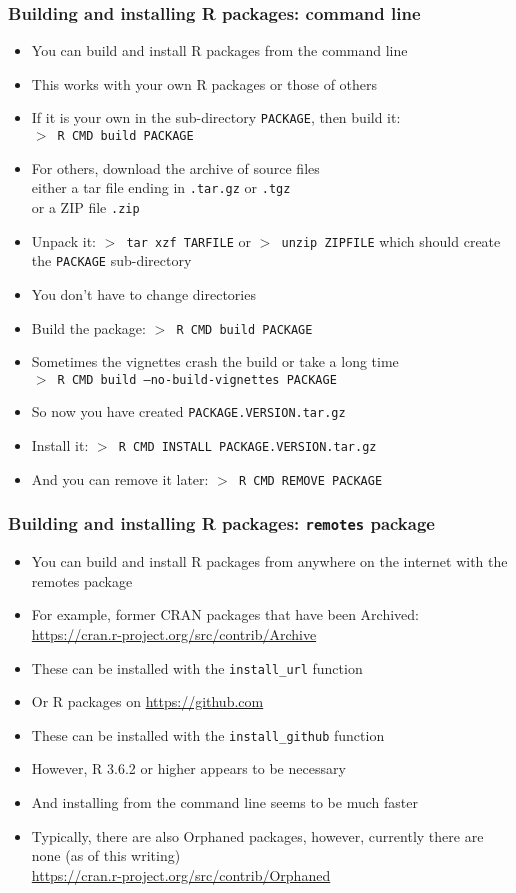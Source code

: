 \documentclass[11pt,pdftex,dvipsnames,usenames,helvetica]{beamer}
\begin{document}
\begin{frame}[fragile]
\frametitle{Building and installing R packages: command line}
\begin{itemize}
\item You can build and install R packages from the command line
\item This works with your own R packages or those of others
\item If it is your own in the sub-directory {\tt PACKAGE},
then build it:\\ {\tt $>$ R CMD build PACKAGE}
\item For others, download the archive of source files\\ either a tar file 
ending in {\tt .tar.gz} or {\tt .tgz}\\ or a ZIP file {\tt .zip}
\item Unpack it: {\tt $>$ tar xzf TARFILE} or 
{\tt $>$ unzip ZIPFILE} which should create the {\tt PACKAGE} sub-directory
\item You don't have to change directories
\item Build the package: {\tt $>$ R CMD build PACKAGE}
\item Sometimes the vignettes crash the build or take a long time\\
{\tt $>$ R CMD build --no-build-vignettes PACKAGE}
\item So now you have created {\tt PACKAGE.VERSION.tar.gz}
\item Install it: {\tt $>$ R CMD INSTALL PACKAGE.VERSION.tar.gz}
\item And you can remove it later: {\tt $>$ R CMD REMOVE PACKAGE}
\end{itemize}

\end{frame}

\begin{frame}[fragile]
\frametitle{Building and installing R packages: {\tt remotes} package}
\begin{itemize}
\item You can build and install R packages from anywhere on the
internet with the remotes package
\item For example, former CRAN packages that have 
been Archived: \url{https://cran.r-project.org/src/contrib/Archive}
\item These can be installed with the {\tt install\_url} function
\item Or R packages on \url{https://github.com}
\item These can be installed with the {\tt install\_github} function
\item However, R 3.6.2 or higher appears to be necessary
\item And installing from the command line seems to be much faster
\item Typically, there are also Orphaned packages, however, currently
there are none (as of this writing)\\
\url{https://cran.r-project.org/src/contrib/Orphaned}
\end{itemize}

\end{frame}
\end{document}
